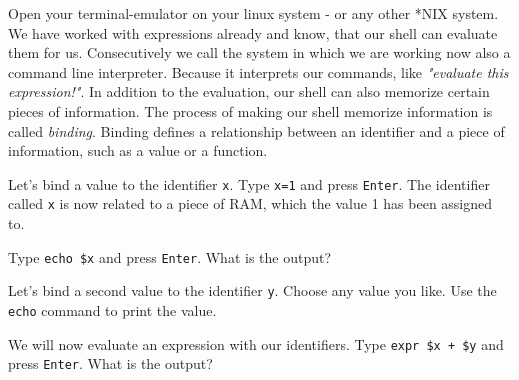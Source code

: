 \begin{challenge}
    \begin{task}
        Open your terminal-emulator on your linux system - or any other *NIX system.
        We have worked with expressions already and know, that our shell can evaluate them for us.
        Consecutively we call the system in which we are working now also a command line interpreter.
        Because it interprets our commands, like \textit{"evaluate this expression!"}.
        In addition to the evaluation, our shell can also memorize certain pieces of information.
        The process of making our shell memorize information is called \textit{binding}.
        Binding defines a relationship between an identifier and a piece of information, such as a value or a function.        
        \begin{questions}
            \item Let's bind a value to the identifier \texttt{x}. Type \texttt{x=1} and press \texttt{Enter}. The identifier called \texttt{x} is now related to a piece of RAM, which the value 1 has been assigned to.
            \item Type \texttt{echo \$x} and press \texttt{Enter}. What is the output?
            \item Let's bind a second value to the identifier \texttt{y}. Choose any value you like. Use the \texttt{echo} command to print the value.
            \item We will now evaluate an expression with our identifiers. Type \texttt{expr \$x + \$y} and press \texttt{Enter}. What is the output?
        \end{questions}
    \end{task}


\end{challenge}
